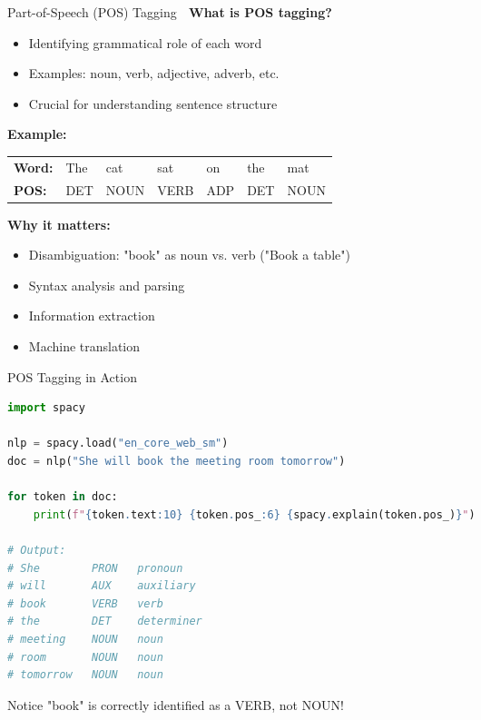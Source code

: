 \documentclass[aspectratio=169]{beamer}
\begin{document}
\begin{frame}[shrink=10]{Part-of-Speech (POS) Tagging 🎯}
    \textbf{What is POS tagging?}
    \begin{itemize}\setlength{\itemsep}{0pt}
        \item Identifying grammatical role of each word
        \item Examples: noun, verb, adjective, adverb, etc.
        \item Crucial for understanding sentence structure
    \end{itemize}

    \vspace{0.5em}
    \textbf{Example:}
    \begin{center}
        \begin{tabular}{lllllll}
            \textbf{Word:} & The & cat & sat & on & the & mat \\
            \textbf{POS:} & DET & NOUN & VERB & ADP & DET & NOUN \\
        \end{tabular}
    \end{center}

    \vspace{0.5em}
    \textbf{Why it matters:}
    \begin{itemize}\setlength{\itemsep}{0pt}
        \item Disambiguation: "book" as noun vs. verb ("Book a table")
        \item Syntax analysis and parsing
        \item Information extraction
        \item Machine translation
    \end{itemize}
\end{frame}

\begin{frame}[fragile]{POS Tagging in Action 🚀}
    \begin{lstlisting}[language=Python]
import spacy

nlp = spacy.load("en_core_web_sm")
doc = nlp("She will book the meeting room tomorrow")

for token in doc:
    print(f"{token.text:10} {token.pos_:6} {spacy.explain(token.pos_)}")

# Output:
# She        PRON   pronoun
# will       AUX    auxiliary
# book       VERB   verb
# the        DET    determiner
# meeting    NOUN   noun
# room       NOUN   noun
# tomorrow   NOUN   noun
    \end{lstlisting}

    \vspace{0.5em}
    Notice "book" is correctly identified as a VERB, not NOUN!
\end{frame}
\end{document}
